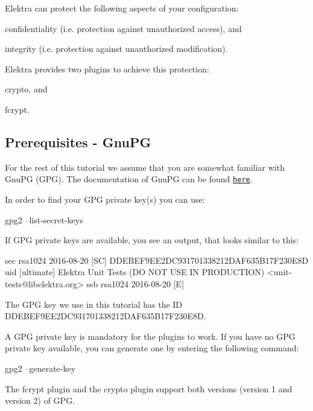 Elektra can protect the following aspects of your configuration\+:


\begin{DoxyEnumerate}
\item confidentiality (i.\+e. protection against unauthorized access), and
\item integrity (i.\+e. protection against unauthorized modification).
\end{DoxyEnumerate}

Elektra provides two plugins to achieve this protection\+:


\begin{DoxyEnumerate}
\item {\ttfamily crypto}, and
\item {\ttfamily fcrypt}.
\end{DoxyEnumerate}

\subsection*{Prerequisites -\/ Gnu\+PG}

For the rest of this tutorial we assume that you are somewhat familiar with Gnu\+PG (G\+PG). The documentation of Gnu\+PG can be found \href{https://gnupg.org/documentation/index.html}{\tt here}.

In order to find your G\+PG private key(s) you can use\+: \begin{DoxyVerb}    gpg2 --list-secret-keys
\end{DoxyVerb}


If G\+PG private keys are available, you see an output, that looks similar to this\+: \begin{DoxyVerb}    sec   rsa1024 2016-08-20 [SC]
              DDEBEF9EE2DC931701338212DAF635B17F230E8D
    uid           [ultimate] Elektra Unit Tests (DO NOT USE IN PRODUCTION) <unit-tests@libelektra.org>
    ssb   rsa1024 2016-08-20 [E]
\end{DoxyVerb}


The G\+PG key we use in this tutorial has the ID {\ttfamily D\+D\+E\+B\+E\+F9\+E\+E2\+D\+C931701338212\+D\+A\+F635\+B17\+F230\+E8D}.

A G\+PG private key is mandatory for the plugins to work. If you have no G\+PG private key available, you can generate one by entering the following command\+: \begin{DoxyVerb}    gpg2 --generate-key
\end{DoxyVerb}


The {\ttfamily fcrypt} plugin and the {\ttfamily crypto} plugin support both versions (version 1 and version 2) of G\+PG.

